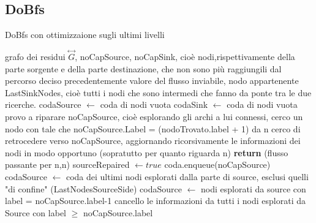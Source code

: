\documentclass{article}
\begin{document}
\subsection{DoBfs}
\begin{algorithm}
\caption{DoBfs con ottimizzaione sugli ultimi livelli}
\begin{algorithmic}[1]
\REQUIRE grafo dei residui $\overset{\leftrightarrow}{G}$, noCapSource, noCapSink, cioè nodi,rispettivamente della parte sorgente e della parte destinazione, che non sono più raggiungili dal percorso deciso precedentemente 
\ENSURE valore del flusso inviabile, nodo appartenente LastSinkNodes, cioè tutti i nodi che sono intermedi che fanno da ponte tra le due ricerche.
\STATE codaSource $\leftarrow$ coda di nodi vuota
\STATE codaSink $\leftarrow$ coda di nodi vuota
\STATE provo a riparare noCapSource, cioè esplorando gli archi a lui connessi, cerco un nodo con  tale che noCapSource.Label = (nodoTrovato.label + 1)
\STATE da n cerco di retrocedere verso noCapSource, aggiornando ricorsivamente le informazioni dei nodi in modo opportuno (sopratutto per quanto riguarda n)
\STATE \textbf{return} (flusso passante per n,n)
\ENDIF
\ENDFOR
\ELSE
\STATE sourceRepaired $\leftarrow true$
\ENDIF
\ENDIF
{}
\STATE coda.enqueue(noCapSource)
\STATE codaSource $\leftarrow$ coda dei ultimi nodi esplorati dalla parte di source, esclusi quelli "di confine" (LastNodesSourceSide)
\ELSE
\STATE codaSource $\leftarrow$ nodi esplorati da source con label = noCapSource.label-1
\STATE cancello le informazioni da tutti i nodi esplorati da Source con label $\ge$ noCapSource.label
\ENDIF
\ENDIF
{}

\end{algorithmic}
\end{algorithm}

\newpage
\end{document}
